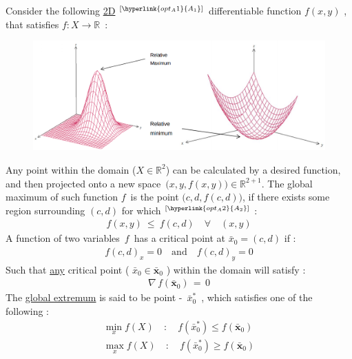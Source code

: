 \documentclass[12pt]{article}
\numberwithin{equation}{section}
\begin{document}
\begin{flushleft}
Consider the following \underline{2D} $^{[\hyperlink{opt_A1}{A_{\text{1}}}]}$ differentiable function $f(x, y)$ , that satisfies $f : X \rightarrow \mathbb{R}$ \,:
\begin{figure}[H]
\centering
\includegraphics[width=0.975 \linewidth, center]{3d_graph_0.png}
\end{figure}
Any point within the domain ($X \in \mathbb{R}^2$) can be calculated by a desired function, and then projected onto a new space \,$\big( x, y, f(x, y) \big)  \in \mathbb{R}^{2+1}$. The global maximum of such function $f$\, is the point $\big( c, d, f(c, d) \big)$, if there exists some region surrounding $(c, d)$ for which $^{[\hyperlink{opt_A2}{A_{\text{2}}}]}$ :
\begin{align*}
f(x, y) \ \leq \ f(c, d) \quad \forall \quad (x, y) 
\end{align*}
A function of two variables \,$f$\, has a critical point at $\bar{x}_0 = (c, d)$ if :
\begin{align*}
f(c, d)_{x} = 0 \quad \text{and} \quad f(c, d)_{y} = 0 
\end{align*}
Such that \underline{any} critical point ( $\bar{x}_0 \in \bar{\textbf{x}}_0 $ ) within the domain will satisfy :
\begin{align*}
\nabla \, f( \bar{\textbf{x}}_0 ) \, = \, 0
\end{align*}
The \underline{global extremum} is said to be point - \,$\bar{x}_0^*$ \,, which satisfies one of the following :
\begin{align*} \label{global_ext}
\min_x f(X) \quad : \quad f(\bar{x}_0^*) \leq f(\bar{\textbf{x}}_0) \\
\max_x f(X) \quad : \quad f(\bar{x}_0^*) \geq f(\bar{\textbf{x}}_0) \\
\end{align*}


\end{flushleft}
\end{document}
